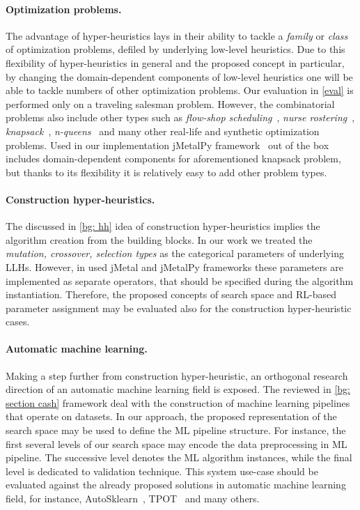 \paragraph{Optimization problems.} The advantage of hyper-heuristics lays in their ability to tackle a \emph{family} or \emph{class} of optimization problems, defiled by underlying low-level heuristics. Due to this flexibility of hyper-heuristics in general and the proposed concept in particular, by changing the domain-dependent components of low-level heuristics one will be able to tackle numbers of other optimization problems. Our evaluation in \cref{eval} is performed only on a traveling salesman problem. However, the combinatorial problems also include other types such as \emph{flow-shop scheduling}~\cite{gupta2006flowshop}, \emph{nurse rostering}~\cite{cheang2003nurse}, \emph{knapsack}~\cite{ross1989stochastic}, \emph{n-queens}~\cite{rivin1994n} and many other real-life and synthetic optimization problems. Used in our implementation jMetalPy framework~\cite{benitez2019jmetalpy} out of the box includes domain-dependent components for aforementioned knapsack problem, but thanks to its flexibility it is relatively easy to add other problem types.

\paragraph{Construction hyper-heuristics.} The discussed in \cref{bg: hh} idea of construction hyper-heuristics implies the algorithm creation from the building blocks. In our work we treated the \emph{mutation, crossover, selection types} as the categorical parameters of underlying LLHs. However, in used jMetal and jMetalPy frameworks these parameters are implemented as separate operators, that should be specified during the algorithm instantiation. Therefore, the proposed concepts of search space and RL-based parameter assignment may be evaluated also for the construction hyper-heuristic cases.

\paragraph{Automatic machine learning.} Making a step further from construction hyper-heuristic, an orthogonal research direction of an automatic machine learning field is exposed. The reviewed in \cref{bg: section cash} framework deal with the construction of machine learning pipelines that operate on datasets. In our approach, the proposed representation of the search space may be used to define the ML pipeline structure. For instance, the first several levels of our search space may encode the data preprocessing in ML pipeline. The successive level denotes the ML algorithm instances, while the final level is dedicated to validation technique. This system use-case should be evaluated against the already proposed solutions in automatic machine learning field, for instance, AutoSklearn~\cite{feurer2015efficient}, TPOT~\cite{olson2019tpot} and many others.


